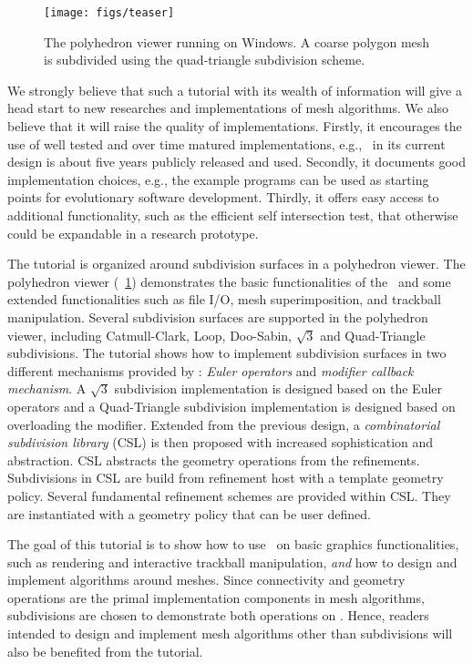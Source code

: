 \documentclass[twocolumn]{article}
\begin{document}
\begin{figure}[h]
  \centering
  \texttt{[image: figs/teaser]}
  \caption{The polyhedron viewer running on Windows. A coarse polygon 
    mesh is subdivided using the quad-triangle subdivision scheme.}
  \label{fig:viewer}
\end{figure}

We strongly believe that such a tutorial with its wealth of
information will give a head start to new researches and implementations
of mesh algorithms. We also believe that it will raise the quality of
implementations. Firstly, it encourages the use of well tested and
over time matured implementations, e.g., \cgalpoly\ in its current
design is about five years publicly released and used. Secondly, it
documents good implementation choices, e.g., the example programs can
be used as starting points for evolutionary software development.
Thirdly, it offers easy access to additional functionality, such as
the efficient self intersection test, that otherwise could be
expandable in a research prototype.

The tutorial is organized around subdivision surfaces in a 
polyhedron viewer. The polyhedron viewer
(\figurename\ \ref{fig:viewer}) demonstrates the basic functionalities of
the \cgalpoly\ and some extended functionalities such as file I/O,
mesh superimposition, and trackball manipulation. Several subdivision
surfaces are supported in the polyhedron viewer, including
Catmull-Clark, Loop, Doo-Sabin, $\sqrt{3}$ and Quad-Triangle
subdivisions.  The tutorial shows how to implement subdivision
surfaces in two different mechanisms provided by \cgalpoly :
\emph{Euler operators} and \emph{modifier callback mechanism}.  A
$\sqrt{3}$ subdivision implementation is designed based on the Euler
operators and a Quad-Triangle subdivision implementation is designed
based on overloading the modifier.  Extended from the previous design,
a \emph{combinatorial subdivision library} (CSL) is then proposed with
increased sophistication and abstraction. CSL abstracts the geometry
operations from the refinements. Subdivisions in CSL are build from
refinement host with a template geometry policy. Several fundamental
refinement schemes are provided within CSL. They are instantiated with a
geometry policy that can be user defined.

The goal of this tutorial is to show how to use \cgalpoly\ 
on basic graphics functionalities, such as rendering and 
interactive trackball manipulation, \emph{and} how to design and 
implement algorithms around meshes. Since connectivity and 
geometry operations are the primal implementation components
in mesh algorithms, subdivisions are chosen to
demonstrate both operations on \cgalpoly . 
Hence, readers intended to design and implement 
mesh algorithms other than subdivisions will also be 
benefited from the tutorial.
\end{document}
